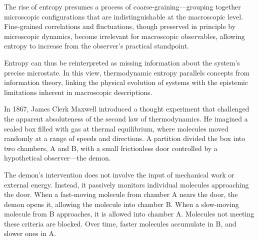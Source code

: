 The rise of entropy presumes a process of coarse-graining—grouping together microscopic configurations that are indistinguishable at the macroscopic level. Fine-grained correlations and fluctuations, though preserved in principle by microscopic dynamics, become irrelevant for macroscopic observables, allowing entropy to increase from the observer’s practical standpoint.

Entropy can thus be reinterpreted as missing information about the system’s precise microstate. In this view, thermodynamic entropy parallels concepts from information theory, linking the physical evolution of systems with the epistemic limitations inherent in macroscopic descriptions.

In 1867, James Clerk Maxwell introduced a thought experiment that challenged the apparent absoluteness of the second law of thermodynamics. He imagined a sealed box filled with gas at thermal equilibrium, where molecules moved randomly at a range of speeds and directions. A partition divided the box into two chambers, A and B, with a small frictionless door controlled by a hypothetical observer—the demon.

The demon’s intervention does not involve the input of mechanical work or external energy. Instead, it passively monitors individual molecules approaching the door. When a fast-moving molecule from chamber A nears the door, the demon opens it, allowing the molecule into chamber B. When a slow-moving molecule from B approaches, it is allowed into chamber A. Molecules not meeting these criteria are blocked. Over time, faster molecules accumulate in B, and slower ones in A.

